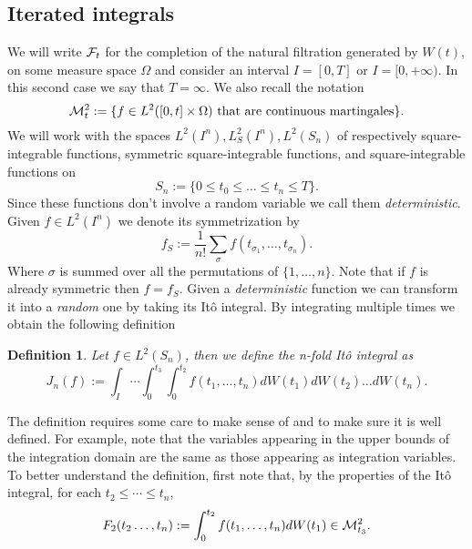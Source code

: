 \documentclass[13pt]{article}
\newtheorem{definition}{Definition}
\begin{document}
\subsection{Iterated integrals}
We will write $\mathcal{F}_t$ for the completion of the natural filtration generated by $W(t)$, on some measure space  $\Omega$ and consider an interval $I=[0,T]$ or  $I=[0,+\infty)$. In this second case we say that $T=\infty.$ We also recall the notation
\begin{equation*}
	\mathcal{M}_t^2:=\{f\in L^2([0,t]\times\Omega)\text{ that are continuous martingales}\}.
\end{equation*}
We will work with the spaces $L^2(I^n), L^2_S(I^n), L^2(S_n)$ of respectively square-integrable functions, symmetric square-integrable functions, and square-integrable functions on
\begin{equation*}
	S_n:=\{0\leq t_0\leq\ldots\leq t_n\leq T\}.
\end{equation*}
Since these functions don't involve a random variable we call them \emph{deterministic}. Given $f\in L^2(I^n)$ we denote its symmetrization by
\begin{equation*}
	f_S:=\frac{1}{n!}\sum_{\sigma} f(t_{\sigma_1},\ldots,t_{\sigma_n}).
\end{equation*}
Where $\sigma$ is summed over all the permutations of $\{1,\ldots,n\}$.
Note that if $f$ is already symmetric then  $f=f_S$. Given a \emph{deterministic} function we can transform it into a \emph{random} one by taking its Itô integral. By integrating multiple times we obtain the following definition
\begin{definition}
	Let $f\in L^2(S_n)$, then we define the \emph{n-fold Itô integral} as
	\begin{equation*}
		J_n(f):=\int_I\cdots \int_{0}^{t_3}\int_{0}^{t_2} f(t_1,\ldots,t_n)dW(t_1) dW(t_2)\ldots dW(t_n).
	\end{equation*}

\end{definition}
The definition requires some care to make sense of and to make sure it is well defined. For example, note that the variables appearing in the upper bounds of the integration domain are the same as those appearing as integration variables. To better understand the definition, first note that, by the properties of the Itô integral, for each $t_2\leq\cdots\leq t_n$,
\begin{equation*}
	F_2(t_2\ldots,t_n):=	\int_{0}^{t_2} f(t_1,\ldots,t_n)dW(t_1) \in \mathcal{M}_{t_3}^2.
\end{equation*}
\end{document}

